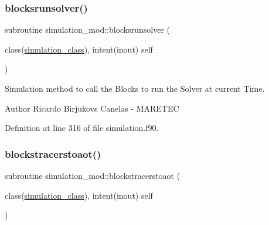 \subsubsection{\texorpdfstring{blocksrunsolver()}{blocksrunsolver()}}
{\footnotesize\ttfamily subroutine simulation\+\_\+mod\+::blocksrunsolver (\begin{DoxyParamCaption}\item[{class(\mbox{\hyperlink{structsimulation__mod_1_1simulation__class}{simulation\+\_\+class}}), intent(inout)}]{self }\end{DoxyParamCaption})\hspace{0.3cm}{\ttfamily [private]}}



Simulation method to call the Blocks to run the Solver at current Time. 

\begin{DoxyAuthor}{Author}
Ricardo Birjukovs Canelas -\/ M\+A\+R\+E\+T\+EC 
\end{DoxyAuthor}


Definition at line 316 of file simulation.\+f90.


\mbox{\label{namespacesimulation__mod_a624d5b402a8d359219839841862ab307}} 
\subsubsection{\texorpdfstring{blockstracerstoaot()}{blockstracerstoaot()}}
{\footnotesize\ttfamily subroutine simulation\+\_\+mod\+::blockstracerstoaot (\begin{DoxyParamCaption}\item[{class(\mbox{\hyperlink{structsimulation__mod_1_1simulation__class}{simulation\+\_\+class}}), intent(inout)}]{self }\end{DoxyParamCaption})\hspace{0.3cm}{\ttfamily [private]}}



